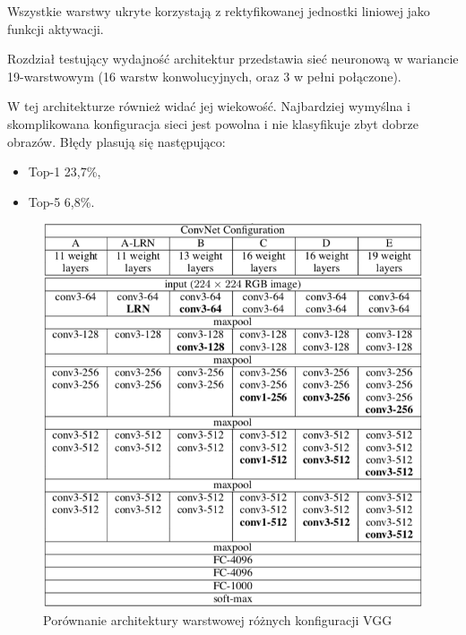 \documentclass[12pt,a4paper,twoside,titlepage,openright]{book}
\begin{document}
\begin{itemize}
\begin{itemize}
Wszystkie warstwy ukryte korzystają z rektyfikowanej jednostki liniowej jako funkcji aktywacji.

Rozdział testujący wydajność architektur przedstawia sieć neuronową w wariancie 19-warstwowym (16 warstw konwolucyjnych, oraz 3 w pełni połączone). \cite{DBLP:journals/corr/SimonyanZ14a}

W tej architekturze również widać jej wiekowość. Najbardziej wymyślna i skomplikowana konfiguracja sieci jest powolna i nie klasyfikuje zbyt dobrze obrazów. Błędy plasują się następująco:
\begin{itemize}
\item Top-1 23,7\%,
\item Top-5 6,8\%.
\end{itemize}

\begin{figure}[ht]
	\centering
			\includegraphics[resolution=100, scale=0.8]{vggArchComparison.png}
		\caption{Porównanie architektury warstwowej różnych konfiguracji VGG}
\end{figure}



\end{itemize}
\end{itemize}
\end{document}
